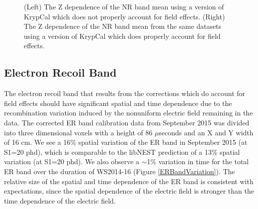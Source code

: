 \begin{figure}
\centering
{}
\qquad
{}
\caption{ (Left) The Z dependence of the NR band mean using a version of KrypCal which does not properly account for field effects. (Right) The Z dependence of the NR band mean from the same datasets using a version of KrypCal which does properly account for field effects.  }
\label{NRBandZ}
\end{figure}

\subsection{Electron Recoil Band}

The electron recoil band that results from the corrections which do account for field effects should have significant spatial and time dependence due to the recombination variation induced by the nonuniform electric field remaining in the data. The corrected ER band calibration data from September 2015 was divided into three dimensional voxels with a height of 86 $\mu$seconds and an X and Y width of 16 cm.  We see a 16\% spatial variation of the ER band in September 2015 (at S1=20 phd), which is comparable to the libNEST prediction of a 13\% spatial variation (at S1=20 phd).  We also observe a $\sim$1\% variation in time for the total ER band over the duration of WS2014-16 (Figure \ref{ERBandVariation}). The relative size of the spatial and time dependence of the ER band is consistent with expectations, since the spatial dependence of the electric field is stronger than the time dependence of the electric field. 

